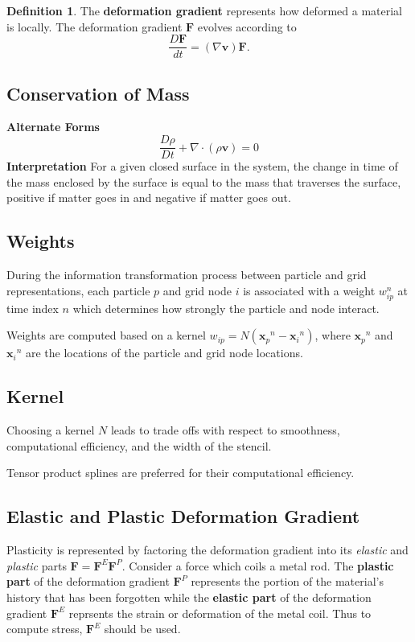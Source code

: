 \documentclass{article}
\theoremstyle{definition}
\newtheorem{definition}{Definition}
\begin{document}
\begin{definition}
	The \textbf{deformation gradient} represents how deformed a material is locally. The deformation gradient $\mathbf{F}$ evolves according to
	\begin{equation*}
	\frac{D\textbf{F}}{dt} = (\nabla \textbf{v})\textbf{F}.
	\end{equation*}
\end{definition}

\subsection{Conservation of Mass}
\textbf{Alternate Forms}
\begin{equation*}
	\frac{D\rho}{Dt} + \nabla \cdot (\rho\textbf{v})=0
\end{equation*}
\noindent\textbf{Interpretation}
For a given closed surface in the system, the change in time of the mass enclosed by the surface is equal to the mass that traverses the surface, positive if matter goes in and negative if matter goes out.

\subsection{Weights}
During the information transformation process between particle and grid representations, each particle $p$ and grid node $i$ is associated with a weight $w_{ip}^n$ at time index $n$ which determines how strongly the particle and node interact.

Weights are computed based on a kernel $w_{ip} = N({\textbf{x}_p}^n - {\textbf{x}_i}^n)$, where ${\textbf{x}_p}^n$ and ${\textbf{x}_i}^n$ are the locations of the particle and grid node locations.

\subsection{Kernel}
Choosing a kernel $N$ leads to trade offs with respect to smoothness, computational efficiency, and the width of the stencil.

Tensor product splines are preferred for their computational efficiency.
\subsection{Elastic and Plastic Deformation Gradient}
Plasticity is represented by factoring the deformation gradient into its \textit{elastic} and \textit{plastic} parts $\textbf{F} = \textbf{F}^E\textbf{F}^P$. Consider a force which coils a metal rod. The \textbf{plastic part} of the deformation gradient $\textbf{F}^P$ represents the portion of the material's history that has been forgotten while the \textbf{elastic part} of the deformation gradient $\textbf{F}^E$ reprsents the strain or deformation of the metal coil. Thus to compute stress, $\textbf{F}^E$ should be used.
\end{document}
